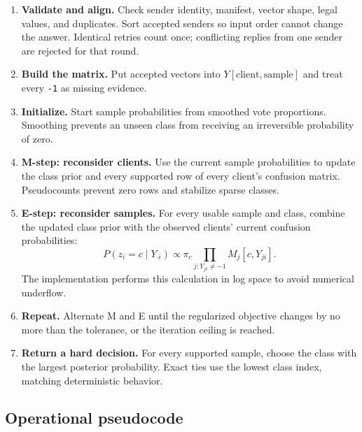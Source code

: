 \documentclass[10pt,a4paper]{article}
\newcommand{\code}[1]{\texttt{#1}}
\begin{document}
\begin{enumerate}
  \item \textbf{Validate and align.} Check sender identity, manifest, vector shape, legal values, and
        duplicates. Sort accepted senders so input order cannot change the answer. Identical retries
        count once; conflicting replies from one sender are rejected for that round.
  \item \textbf{Build the matrix.} Put accepted vectors into $Y[\text{client},\text{sample}]$ and treat
        every \code{-1} as missing evidence.
  \item \textbf{Initialize.} Start sample probabilities from smoothed vote proportions. Smoothing
        prevents an unseen class from receiving an irreversible probability of zero.
  \item \textbf{M-step: reconsider clients.} Use the current sample probabilities to update the
        class prior and every supported row of every client's confusion matrix. Pseudocounts prevent
        zero rows and stabilize sparse classes.
  \item \textbf{E-step: reconsider samples.} For every usable sample and class, combine the updated
        class prior with the observed clients' current confusion probabilities:
        \[
        P(z_i=c\mid Y_{\cdot i}) \propto \pi_c
        \prod_{j:Y_{ji}\neq -1} M_j[c,Y_{ji}].
        \]
        The implementation performs this calculation in log space to avoid numerical underflow.
  \item \textbf{Repeat.} Alternate M and E until the regularized objective changes by no more than
        the tolerance, or the iteration ceiling is reached.
  \item \textbf{Return a hard decision.} For every supported sample, choose the class with the largest
        posterior probability. Exact ties use the lowest class index, matching deterministic behavior.
\end{enumerate}

\subsection{Operational pseudocode}
\end{document}
